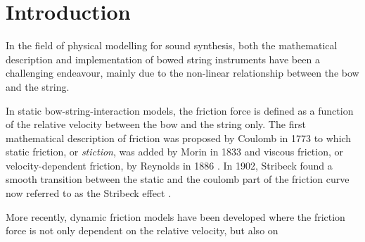 \documentclass[twoside,a4paper]{article}
\title{\papertitle}
\newif\ifpdf
\begin{document}
\ifpdf %
  \DeclareGraphicsExtensions{.png,.jpg,.pdf, .eps} 
\else  %
\fi

\maketitle

\begin{abstract}
This is the template file for the proceedings of the 22\textsuperscript{nd} International Conference on Digital Audio Effects (DAFx-19).
This template has been derived from WASPAA'99 templates and aims at producing conference proceedings in electronic form.
The format is essentially the one used for ICASSP conferences.
Please use either this \LaTeX{} or the accompanying Word formats when preparing your submission.
The templates are available in electronic form on \href{http://dafx2019.bcu.ac.uk/}{http://dafx2019.bcu.ac.uk/}.
\end{abstract}

\section{Introduction}
\label{sec:intro}
In the field of physical modelling for sound synthesis, both the mathematical description and implementation of bowed string instruments have been a challenging endeavour, mainly due to the non-linear relationship between the bow and the string.


In static bow-string-interaction models, the friction force is defined as a function of the relative velocity between the bow and the string only. 
The first mathematical description of friction was proposed by Coulomb in 1773 \cite{Coulomb} to which static friction, or \textit{stiction}, was added by Morin in 1833 \cite{Morin1833} and viscous friction, or velocity-dependent friction, by Reynolds in 1886 \cite{Reynolds1886}. In 1902, Stribeck found a smooth transition between the static and the coulomb part of the friction curve now referred to as the Stribeck effect \cite{Stribeck1902}. 

More recently, dynamic friction models have been developed where the friction force is not only dependent on the relative velocity, but also on 
\end{document}
